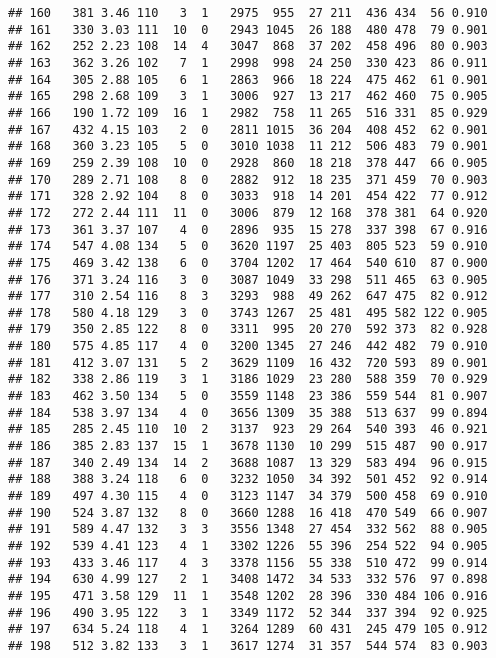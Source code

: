 \documentclass[]{article}
\begin{document}
\begin{verbatim}
## 160   381 3.46 110   3  1   2975  955  27 211  436 434  56 0.910
## 161   330 3.03 111  10  0   2943 1045  26 188  480 478  79 0.901
## 162   252 2.23 108  14  4   3047  868  37 202  458 496  80 0.903
## 163   362 3.26 102   7  1   2998  998  24 250  330 423  86 0.911
## 164   305 2.88 105   6  1   2863  966  18 224  475 462  61 0.901
## 165   298 2.68 109   3  1   3006  927  13 217  462 460  75 0.905
## 166   190 1.72 109  16  1   2982  758  11 265  516 331  85 0.929
## 167   432 4.15 103   2  0   2811 1015  36 204  408 452  62 0.901
## 168   360 3.23 105   5  0   3010 1038  11 212  506 483  79 0.901
## 169   259 2.39 108  10  0   2928  860  18 218  378 447  66 0.905
## 170   289 2.71 108   8  0   2882  912  18 235  371 459  70 0.903
## 171   328 2.92 104   8  0   3033  918  14 201  454 422  77 0.912
## 172   272 2.44 111  11  0   3006  879  12 168  378 381  64 0.920
## 173   361 3.37 107   4  0   2896  935  15 278  337 398  67 0.916
## 174   547 4.08 134   5  0   3620 1197  25 403  805 523  59 0.910
## 175   469 3.42 138   6  0   3704 1202  17 464  540 610  87 0.900
## 176   371 3.24 116   3  0   3087 1049  33 298  511 465  63 0.905
## 177   310 2.54 116   8  3   3293  988  49 262  647 475  82 0.912
## 178   580 4.18 129   3  0   3743 1267  25 481  495 582 122 0.905
## 179   350 2.85 122   8  0   3311  995  20 270  592 373  82 0.928
## 180   575 4.85 117   4  0   3200 1345  27 246  442 482  79 0.910
## 181   412 3.07 131   5  2   3629 1109  16 432  720 593  89 0.901
## 182   338 2.86 119   3  1   3186 1029  23 280  588 359  70 0.929
## 183   462 3.50 134   5  0   3559 1148  23 386  559 544  81 0.907
## 184   538 3.97 134   4  0   3656 1309  35 388  513 637  99 0.894
## 185   285 2.45 110  10  2   3137  923  29 264  540 393  46 0.921
## 186   385 2.83 137  15  1   3678 1130  10 299  515 487  90 0.917
## 187   340 2.49 134  14  2   3688 1087  13 329  583 494  96 0.915
## 188   388 3.24 118   6  0   3232 1050  34 392  501 452  92 0.914
## 189   497 4.30 115   4  0   3123 1147  34 379  500 458  69 0.910
## 190   524 3.87 132   8  0   3660 1288  16 418  470 549  66 0.907
## 191   589 4.47 132   3  3   3556 1348  27 454  332 562  88 0.905
## 192   539 4.41 123   4  1   3302 1226  55 396  254 522  94 0.905
## 193   433 3.46 117   4  3   3378 1156  55 338  510 472  99 0.914
## 194   630 4.99 127   2  1   3408 1472  34 533  332 576  97 0.898
## 195   471 3.58 129  11  1   3548 1202  28 396  330 484 106 0.916
## 196   490 3.95 122   3  1   3349 1172  52 344  337 394  92 0.925
## 197   634 5.24 118   4  1   3264 1289  60 431  245 479 105 0.912
## 198   512 3.82 133   3  1   3617 1274  31 357  544 574  83 0.903

\end{verbatim}
\end{document}
